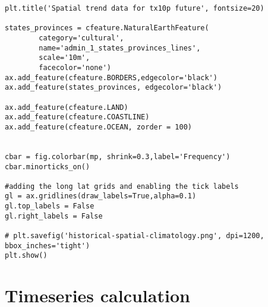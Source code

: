 \documentclass[a4paper, 12pt, twoside]{report}
\begin{document}
\begin{lstlisting}
plt.title('Spatial trend data for tx10p future', fontsize=20)

states_provinces = cfeature.NaturalEarthFeature(
        category='cultural',
        name='admin_1_states_provinces_lines',
        scale='10m',
        facecolor='none')
ax.add_feature(cfeature.BORDERS,edgecolor='black')
ax.add_feature(states_provinces, edgecolor='black')

ax.add_feature(cfeature.LAND)
ax.add_feature(cfeature.COASTLINE)
ax.add_feature(cfeature.OCEAN, zorder = 100)


cbar = fig.colorbar(mp, shrink=0.3,label='Frequency')
cbar.minorticks_on()

#adding the long lat grids and enabling the tick labels
gl = ax.gridlines(draw_labels=True,alpha=0.1)
gl.top_labels = False
gl.right_labels = False

# plt.savefig('historical-spatial-climatology.png', dpi=1200, bbox_inches='tight')
plt.show()

\end{lstlisting}


\section{Timeseries calculation}
\end{document}
